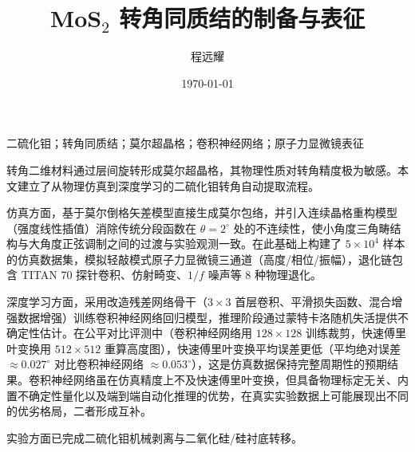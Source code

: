 \documentclass[supercite]{HustGraduPaper}
\title{MoS$_2$ 转角同质结的制备与表征}
\author{程远耀}
\date{\today}
\begin{document}
\maketitle
\statement

\clearpage
{}

\begin{cnabstract}{二硫化钼；转角同质结；莫尔超晶格；卷积神经网络；原子力显微镜表征}

转角二维材料通过层间旋转形成莫尔超晶格，其物理性质对转角精度极为敏感。本文建立了从物理仿真到深度学习的二硫化钼转角自动提取流程。

仿真方面，基于莫尔倒格矢差模型直接生成莫尔包络，并引入连续晶格重构模型（强度线性插值）消除传统分段函数在 $\theta = 2^{\circ}$ 处的不连续性，使小角度三角畴结构与大角度正弦调制之间的过渡与实验观测一致。在此基础上构建了 $5\times10^4$ 样本的仿真数据集，模拟轻敲模式原子力显微镜三通道（高度/相位/振幅），退化链包含 TITAN 70 探针卷积、仿射畸变、$1/f$ 噪声等 8 种物理退化。

深度学习方面，采用改造残差网络骨干（$3{\times}3$ 首层卷积、平滑损失函数、混合增强数据增强）训练卷积神经网络回归模型，推理阶段通过蒙特卡洛随机失活提供不确定性估计。在公平对比评测中（卷积神经网络用 $128{\times}128$ 训练裁剪，快速傅里叶变换用 $512{\times}512$ 重算高度图），快速傅里叶变换平均误差更低（平均绝对误差 $\approx 0.027^{\circ}$ 对比卷积神经网络 $\approx 0.053^{\circ}$），这是仿真数据保持完整周期性的预期结果。卷积神经网络虽在仿真精度上不及快速傅里叶变换，但具备物理标定无关、内置不确定性量化以及端到端自动化推理的优势，在真实实验数据上可能展现出不同的优劣格局，二者形成互补。

实验方面已完成二硫化钼机械剥离与二氧化硅/硅衬底转移。

\end{cnabstract}
\end{document}
